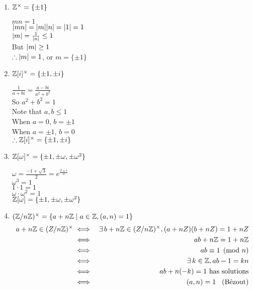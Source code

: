\documentclass[letterpaper,12pt,fleqn]{article}
\newcommand{\x}{\times}
\newcommand{\w}{\omega}
\begin{document}
\begin{example}
  \listbreak
  \begin{enumerate}
  \item $\Z^{\x}=\{\pm1\}$

    $mn=1$ \\
    $\lvert mn\rvert=\lvert m\rvert\lvert n\rvert=\lvert1\rvert=1$ \\
    $\lvert m\rvert=\frac{1}{\lvert n\rvert}\le1$ \\
    But $\lvert m\rvert\ge1$ \\
    $\therefore \lvert m\rvert=1$, or $m=\{\pm1\}$

  \item $\Z[i]^{\x}=\{\pm1,\pm i\}$

    $\frac{1}{a+bi}=\frac{a-bi}{a^2+b^2}$ \\
    So $a^2+b^2=1$ \\
    Note that $a,b\le1$ \\
    When $a=0$, $b=\pm1$ \\
    When $a=\pm1$, $b=0$ \\
    $\therefore \Z[i]^{\x}=\{\pm1,\pm i\}$
\newpage
  \item $\Z[\w]^{\x}=\{\pm1,\pm\w,\pm\w^2\}$

    $\w=\frac{-1+\sqrt{3}}{2}=e^{\frac{2\pm i}{3}}$ \\
    $\w^3=1$ \\
    $1\cdot1=1$ \\
    $\w\cdot\w^2=1$ \\
    $\Z[\w]=\{\pm1,\pm\w,\pm\w^2\}$

  \item $(\Z/n\Z)^{\x}=\{a+n\Z\mid a\in\Z, (a,n)=1\}$
    \begin{eqnarray*}
      a+n\Z\in(Z/n\Z)^{\x} &\iff& \exists\,b+n\Z\in(Z/n\Z)^{\x},(a+nZ)(b+nZ)=1+nZ \\
      &\iff& ab+n\Z=1+n\Z \\
      &\iff& ab\equiv1\pmod n \\
      &\iff& \exists\,k\in\Z,ab-1=kn \\
      &\iff& ab+n(-k)=1\ \mbox{has solutions} \\
      &\iff& (a,n)=1\hspace{2ex}(\mbox{B\'ezout})
    \end{eqnarray*}
    
  \end{enumerate}
\end{example}
\end{document}
